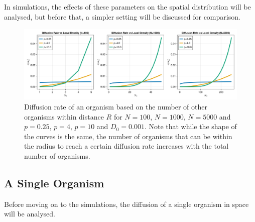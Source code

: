 \documentclass{article}
\begin{document}
In simulations, the effects of these parameters on the spatial distribution will be analysed, but before that, a simpler setting will be discussed for comparison.
\begin{figure}
    \label{diffusion_rates} 
    \centering
    \includegraphics[width=1.0\linewidth]{img/diffusion_rates.png}
    \caption{Diffusion rate of an organism based on the number of other organisms within distance $R$ for $N=100$, $N=1000$, $N=5000$ and $p=0.25$, $p=4$, $p=10$ and $D_0 = 0.001$. Note that while the shape of the curves is the same, the number of organisms that can be within the radius to reach a certain diffusion rate increases with the total number of organisms.}
\end{figure}

\subsection{A Single Organism}
Before moving on to the simulations, the diffusion of a single organism in space will be analysed.
\end{document}
